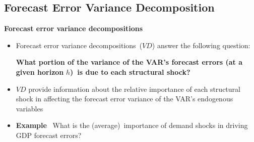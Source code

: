 
\subsection{Forecast Error Variance Decomposition}

\begin{frame}
\vspace{3cm} \color{title}\bigskip

\color{note}
\end{frame}


\begin{frame}
{\textbf{Forecast error variance decompositions}}\bigskip \bigskip

\begin{itemize}
\item Forecast error variance decompositions\ ($VD$) answer the following
question:\bigskip

\textbf{What portion of the variance of the VAR's forecast errors (at a
given horizon }$h$\textbf{)\ is due to each structural shock?}\bigskip
\medskip \pause

\item $VD$ provide information about the relative importance of each
structural shock in affecting the forecast error variance of the VAR's
endogenous variables\bigskip \medskip

\item \textbf{Example} \ What is the (average)\ importance of demand shocks
in driving GDP forecast errors?
\end{itemize}
\end{frame}


